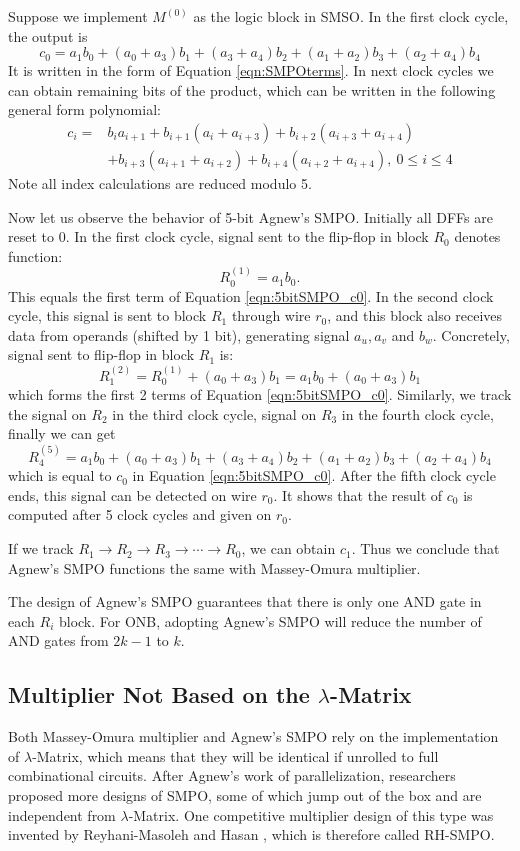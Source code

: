 \begin{Example}
Suppose we implement $M^{(0)}$ as the logic block in SMSO. In the first clock cycle, the output is
\begin{equation}
\label{eqn:5bitSMPO_c0}
c_0 = a_1b_0+(a_0+a_3)b_1 + (a_3+a_4)b_2 + (a_1+a_2)b_3 + (a_2+a_4)b_4
\end{equation}
It is written in the form of Equation \ref{eqn:SMPOterms}. In next clock cycles we can obtain 
remaining bits of the product, which can be written in the following general form polynomial:
\begin{align}
c_i =& b_ia_{i+1} + b_{i+1}(a_i + a_{i+3}) + b_{i+2}(a_{i+3} + a_{i+4}) \nonumber\\
&+ b_{i+3}(a_{i+1} + a_{i+2}) + b_{i+4}
(a_{i+2} + a_{i+4}),\ 0\leq i\leq 4 \nonumber
\end{align}
Note all index calculations are reduced modulo 5.

Now let us observe the behavior of 5-bit Agnew's SMPO. Initially all DFFs are reset to 0. 
In the first clock cycle,
signal sent to the flip-flop in block $R_0$ denotes function:
$$R_0^{(1)} = a_1b_0.$$
This equals the first term of Equation \ref{eqn:5bitSMPO_c0}. In the second clock cycle,
this signal is sent to block $R_1$ through wire $r_0$, and this block also receives data 
from operands (shifted by 1 bit), generating signal $a_u,a_v$ and $b_w$. Concretely,
signal sent to flip-flop in block $R_1$ is:
$$R_1^{(2)} = R_0^{(1)} + (a_0+a_3)b_1 = a_1b_0+(a_0+a_3)b_1$$
which forms the first 2 terms of Equation \ref{eqn:5bitSMPO_c0}. Similarly, we track the signal 
on $R_2$ in the third clock cycle, signal on $R_3$ in the fourth clock cycle, finally we can get 
$$R_4^{(5)} = a_1b_0+(a_0+a_3)b_1 + (a_3+a_4)b_2 + (a_1+a_2)b_3 + (a_2+a_4)b_4$$
which is equal to $c_0$ in Equation \ref{eqn:5bitSMPO_c0}.
After the fifth clock cycle ends, this signal can be detected on wire $r_0$. It shows that 
the result of $c_0$ is computed after 5 clock cycles and given on $r_0$.

If we track $R_1\to R_2\to R_3 \to \cdots \to R_0$, we can obtain $c_1$.
Thus we conclude that Agnew's SMPO functions the same with Massey-Omura multiplier.
\end{Example}

The design of Agnew's SMPO guarantees that there is only one AND gate in each $R_i$ block.
For ONB, adopting Agnew's SMPO will reduce the number of AND gates from $2k-1$ to $k$.

\subsection{Multiplier Not Based on the $\lambda$-Matrix}
Both Massey-Omura multiplier and Agnew's SMPO rely on the implementation of $\lambda$-Matrix,
which means that they will be identical if unrolled to full combinational circuits. 
After Agnew's work of parallelization, researchers proposed more designs of SMPO, 
some of which jump out of the box and are independent from $\lambda$-Matrix.
One competitive multiplier design of this type was invented by Reyhani-Masoleh and Hasan 
\cite{RHmulti}, which is therefore called RH-SMPO.

